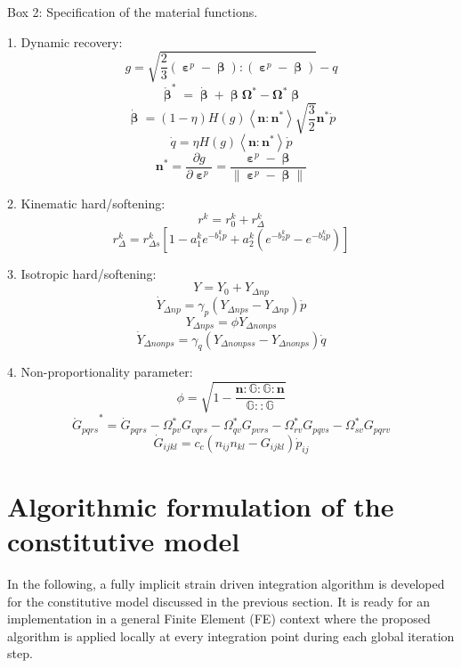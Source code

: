 \begin{framed}
\label{Box:1}
Box 2: Specification of the material functions.

1. Dynamic recovery:
\[g = \sqrt {\frac{2}{3}\left( {{{\bm{\upepsilon }}^p} - {\bm{\upbeta}}} \right):\left( {{{\bm{\upepsilon }}^p} - {\bm{\upbeta}}} \right)}  - q\]
\[{\mathring {\bm{\upbeta }}^{*}} = \dot {\bm{\upbeta }}  + \bm{\upbeta } {{\mathbf{\Omega }}^*} - {{\mathbf{\Omega }}^*}\bm{\upbeta }\]
\[\dot{\bm{\upbeta}}  = \left( {1 - \eta } \right)H\left( g \right)\left\langle {{\mathbf{n}}:{{\mathbf{n}}^*}} \right\rangle \sqrt {\frac{3}{2}} {{\mathbf{n}}^*}\dot p\]
\[\dot q = \eta H\left( g \right)\left\langle {{\mathbf{n}}:{{\mathbf{n}}^*}} \right\rangle \dot p\]
\[{{\mathbf{n}}^*} = \frac{{\partial g}}{{\partial {{\bm{\upepsilon }}^p}}} = \frac{{{{\bm{\upepsilon }}^p} - {\bm{\upbeta}}}}{{\left\| {{{\bm{\upepsilon }}^p} - {\bm{\upbeta}}} \right\|}}\]

2. Kinematic hard/softening:
\[{r^k} = r_0^k + r_\Delta ^k\]
\[r_\Delta ^k = r_{\Delta s}^k\left[ {1 - a_1^k{e^{ - b_1^kp}} + a_2^k({e^{ - b_2^kp}} - {e^{ - b_3^kp}})} \right]\]

3. Isotropic hard/softening:
\[Y = {Y_0} + {Y_{\Delta np}}\]
\[{\dot Y_{\Delta np}} = {\gamma _p}\left( {{Y_{\Delta nps}} - {Y_{\Delta np}}} \right)\dot p\]
\[{Y_{\Delta nps}} = \phi {Y_{\Delta nonps}}\]
\[{\dot Y_{\Delta nonps}} = {\gamma _q}\left( {{Y_{\Delta nonpss}} - {Y_{\Delta nonps}}} \right)\dot q\]


4. Non-proportionality parameter:
\[\phi  = \sqrt {1 - \frac{{{\mathbf{n}}:\mathbb{G}:\mathbb{G}:{\mathbf{n}}}}{{\mathbb{G}::\mathbb{G}}}} \]
\[{\mathring G _{pqrs}}^* = {{\dot G}_{pqrs}} - \Omega _{pv}^*{G_{vqrs}} - \Omega _{qv}^*{G_{pvrs}} - \Omega _{rv}^*{G_{pqvs}} - \Omega _{sv}^*{G_{pqrv}}\]
\[{{\dot G}_{ijkl}} = {c_c}\left( {{n_{ij}}{n_{kl}} - {G_{ijkl}}} \right){{\dot p}_{ij}}\]
\end{framed}

\section{Algorithmic formulation of the constitutive model}
In the following, a fully implicit strain driven integration algorithm is developed for the constitutive model discussed in the previous section. It is ready for an implementation in a general Finite Element (FE) context where the proposed algorithm is applied locally at every integration point during each global iteration step.

